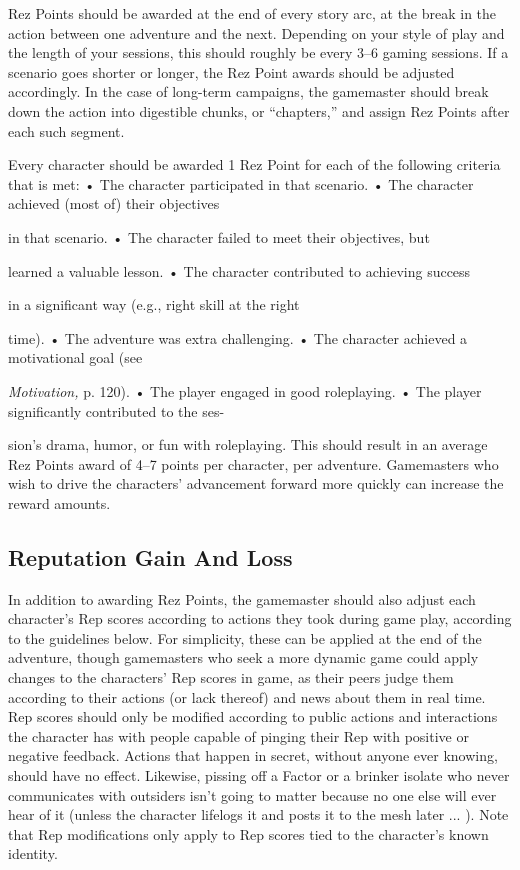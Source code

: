Rez Points should be awarded at the end of every 
story arc, at the break in the action between one adventure
and the next. Depending on your style of play
and the length of your sessions, this should roughly be 
every 3–6 gaming sessions. If a scenario goes shorter 
or longer, the Rez Point awards should be adjusted 
accordingly. In the case of long-term campaigns, the 
gamemaster should break down the action into digestible
chunks, or ``chapters,'' and assign Rez Points after
each such segment.

Every character should be awarded 1 Rez Point for 
each of the following criteria that is met:
•  The character participated in that scenario.
•  The character achieved (most of) their objectives 

in that scenario.
•  The character failed to meet their objectives, but 

learned a valuable lesson.
•  The character contributed to achieving success 

in a significant way (e.g., right skill at the right 

time).
•  The adventure was extra challenging.
•  The character achieved a motivational goal (see 

\textit{Motivation,} p. 120).
•  The player engaged in good roleplaying.
•  The player significantly contributed to the ses-

sion's drama, humor, or fun with roleplaying.
This should result in an average Rez Points award 
of 4–7 points per character, per adventure. Gamemasters
who wish to drive the characters' advancement
forward more quickly can increase the reward
amounts. 

\subsection{Reputation Gain And Loss}

In addition to awarding Rez Points, the gamemaster 
should also adjust each character's Rep scores according
to actions they took during game play, according to
the guidelines below. For simplicity, these can be applied 
at the end of the adventure, though gamemasters who 
seek a more dynamic game could apply changes to the 
characters' Rep scores in game, as their peers judge 
them according to their actions (or lack thereof) and 
news about them in real time. Rep scores should only 
be modified according to public actions and interactions 
the character has with people capable of pinging their 
Rep with positive or negative feedback. Actions that 
happen in secret, without anyone ever knowing, should 
have no effect. Likewise, pissing off a Factor or a brinker 
isolate who never communicates with outsiders isn't 
going to matter because no one else will ever hear of it 
(unless the character lifelogs it and posts it to the mesh 
later ... ). Note that Rep modifications only apply to Rep 
scores tied to the character's known identity. 

